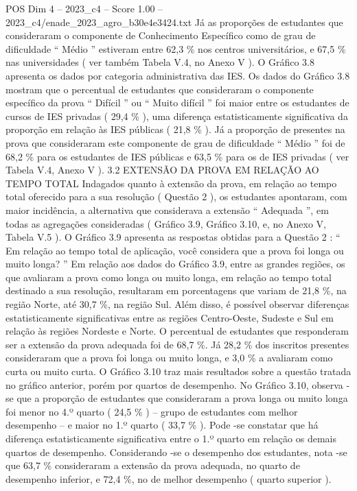 \begin{textsample}{POS Dim 4 – 2023\_c4 – Score 1.00 – 2023\_c4/enade\_2023\_agro\_b30e4e3424.txt}
Já as proporções de estudantes que consideraram o componente de Conhecimento Específico como de grau de dificuldade “ Médio ” estiveram entre 62,3 \% nos centros universitários, e 67,5 \% nas universidades ( ver também Tabela V.4, no Anexo V ).
O Gráfico 3.8 apresenta os dados por categoria administrativa das IES.
Os dados do Gráfico 3.8 mostram que o percentual de estudantes que consideraram o componente específico da prova “ Difícil ” ou “ Muito difícil ” foi maior entre os estudantes de cursos de IES privadas ( 29,4 \% ), uma diferença estatisticamente significativa da proporção em relação às IES públicas ( 21,8 \% ).
Já a proporção de presentes na prova que consideraram este componente de grau de dificuldade “ Médio ” foi de 68,2 \% para os estudantes de IES públicas e 63,5 \% para os de IES privadas ( ver Tabela V.4, Anexo V ). 3.2 EXTENSÃO DA PROVA EM RELAÇÃO AO TEMPO TOTAL Indagados quanto à extensão da prova, em relação ao tempo total oferecido para a sua resolução ( Questão 2 ), os estudantes apontaram, com maior incidência, a alternativa que considerava a extensão “ Adequada ”, em todas as agregações consideradas ( Gráfico 3.9, Gráfico 3.10, e, no Anexo V, Tabela V.5 ).
O Gráfico 3.9 apresenta as respostas obtidas para a Questão 2 : “ Em relação ao tempo total de aplicação, você considera que a prova foi longa ou muito longa? ” Em relação aos dados do Gráfico 3.9, entre as grandes regiões, os que avaliaram a prova como longa ou muito longa, em relação ao tempo total destinado a sua resolução, resultaram em porcentagens que variam de 21,8 \%, na região Norte, até 30,7 \%, na região Sul.
Além disso, é possível observar diferenças estatisticamente significativas entre as regiões Centro-Oeste, Sudeste e Sul em relação às regiões Nordeste e Norte.
O percentual de estudantes que responderam ser a extensão da prova adequada foi de 68,7 \%.
Já 28,2 \% dos inscritos presentes consideraram que a prova foi longa ou muito longa, e 3,0 \% a avaliaram como curta ou muito curta.
O Gráfico 3.10 traz mais resultados sobre a questão tratada no gráfico anterior, porém por quartos de desempenho.
No Gráfico 3.10, observa -se que a proporção de estudantes que consideraram a prova longa ou muito longa foi menor no 4.º quarto ( 24,5 \% ) – grupo de estudantes com melhor desempenho – e maior no 1.º quarto ( 33,7 \% ).
Pode -se constatar que há diferença estatisticamente significativa entre o 1.º quarto em relação os demais quartos de desempenho.
Considerando -se o desempenho dos estudantes, nota -se que 63,7 \% consideraram a extensão da prova adequada, no quarto de desempenho inferior, e 72,4 \%, no de melhor desempenho ( quarto superior ).

\end{textsample}
